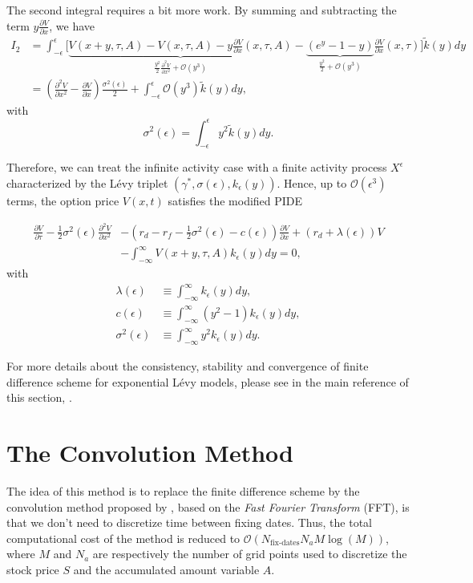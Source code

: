 The second integral requires a bit more work. By summing and subtracting the term $y\frac{\partial V}{\partial x}$, we have
\begin{align*}
I_2 &= \int_{-\epsilon}^{\epsilon}\Bigg[\underbrace{V(x+y,\tau,A)-V(x,\tau,A)-y\frac{\partial V}{\partial x}(x,\tau,A)}_{\frac{y^2}{2}\frac{\partial^2V}{\partial x^2}+\mathcal{O}(y^3)}-\underbrace{\left(e^y-1-y\right)}_{\frac{y^2}{2}+\mathcal{O}(y^3)}\frac{\partial V}{\partial x}(x,\tau)\Bigg]\tilde{k}(y)dy\\
&=\left(\frac{\partial^2 V}{\partial x^2}-\frac{\partial V}{\partial x}\right)\frac{\sigma^2(\epsilon)}{2}+\int_{-\epsilon}^\epsilon \mathcal{O}(y^3)\tilde{k}(y)dy,
\end{align*}
with $$\sigma^2(\epsilon) = \int_{-\epsilon}^\epsilon y^2\tilde{k}(y)dy.$$

Therefore, we can treat the infinite activity case with a finite activity process $X^\epsilon$ characterized by the L\'evy triplet $(\gamma^\ast,\sigma(\epsilon),k_\epsilon(y))$. Hence, up to $\mathcal{O}(\epsilon^3)$ terms, the option price $V(x,t)$ satisfies the modified PIDE

\begin{align*}\frac{\partial V}{\partial \tau}-\frac{1}{2}\sigma^2(\epsilon)\frac{\partial^2V}{\partial x^2}&-\left(r_d-r_f-\frac{1}{2}\sigma^2(\epsilon) -c(\epsilon)\right)\frac{\partial V}{\partial x}+(r_d +\lambda(\epsilon))V \\
&-\int_{-\infty}^\infty V(x+y,\tau,A)k_\epsilon(y) dy = 0,
\end{align*}
with
\begin{align*}
\lambda(\epsilon) &\equiv \int_{-\infty}^\infty k_\epsilon(y)dy,\\
c(\epsilon) &\equiv \int_{-\infty}^\infty \left(y^2-1\right)k_\epsilon(y)dy,\\
\sigma^2(\epsilon) &\equiv \int_{-\infty}^\infty y^2 k_\epsilon(y)dy.
\end{align*}

For more details about the consistency, stability and convergence of finite difference scheme for exponential L\'evy models, please see in the main reference of this section, \citep{CV05}.

\section{The Convolution Method}
\label{sec:methods:conv}
The idea of this method is to replace the finite difference scheme by the convolution method proposed by \citeauthor{Lor+08} \citeyearpar{Lor+08} \cite{Lor+08}, based on the \textit{Fast Fourier Transform} (FFT), is that we don't need to discretize time between fixing dates. Thus, the total computational cost of the method is reduced to $\mathcal{O}(N_\text{fix-dates} N_a M \log(M))$, where $M$ and $N_a$ are respectively the number of grid points used to discretize the stock price $S$ and the accumulated amount variable $A$. 

